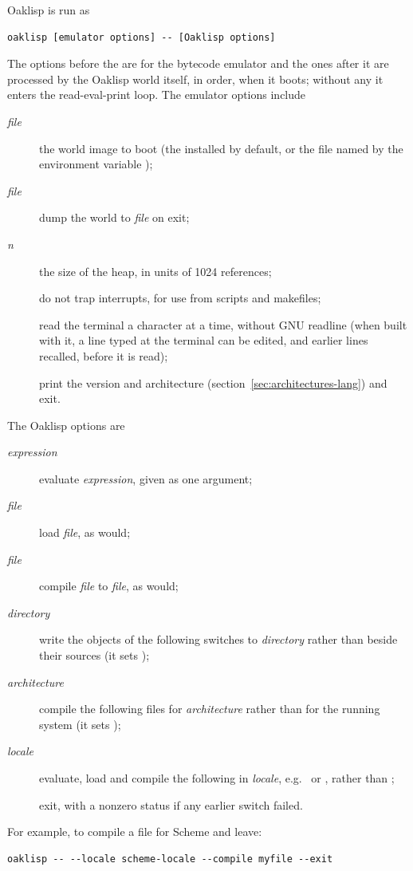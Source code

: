 Oaklisp is run as
\begin{verbatim}
oaklisp [emulator options] -- [Oaklisp options]
\end{verbatim}
The options before the \dfsw{{-}{-}} are for the bytecode emulator and
the ones after it are processed by the Oaklisp world itself, in
order, when it boots; without any it enters the read-eval-print loop.
The emulator options include
\begin{description}
\item[ \emph{file}] the world image to boot (the
  installed  by default, or the file named by the
  environment variable );
\item[ \emph{file}] dump the world to \emph{file} on exit;
\item[ \emph{n}] the size of the heap, in units of
  1024 references;
\item[] do not trap interrupts, for use from scripts
  and makefiles;
\item[] read the terminal a character at a
  time, without GNU readline (when built with it, a line typed at
  the terminal can be edited, and earlier lines recalled, before it is
  read);
\item[] print the version and architecture
  (section~\ref{sec:architectures-lang}) and exit.
\end{description}
The Oaklisp options are
\begin{description}
\item[ \emph{expression}] evaluate \emph{expression},
  given as one argument;
\item[ \emph{file}] load \emph{file}, as  would;
\item[ \emph{file}] compile \emph{file} to
  \emph{file}, as  would;
\item[ \emph{directory}] write the objects of the
  following  switches to \emph{directory} rather than
  beside their sources (it sets );
\item[ \emph{architecture}] compile the following files
  for \emph{architecture} rather than for the running system (it sets
  );
\item[ \emph{locale}] evaluate, load and compile the
  following in \emph{locale}, e.g.\  or
  , rather than ;
\item[] exit, with a nonzero status if any earlier switch
  failed.
\end{description}
For example, to compile a file for Scheme and leave:
\begin{verbatim}
oaklisp -- --locale scheme-locale --compile myfile --exit
\end{verbatim}

